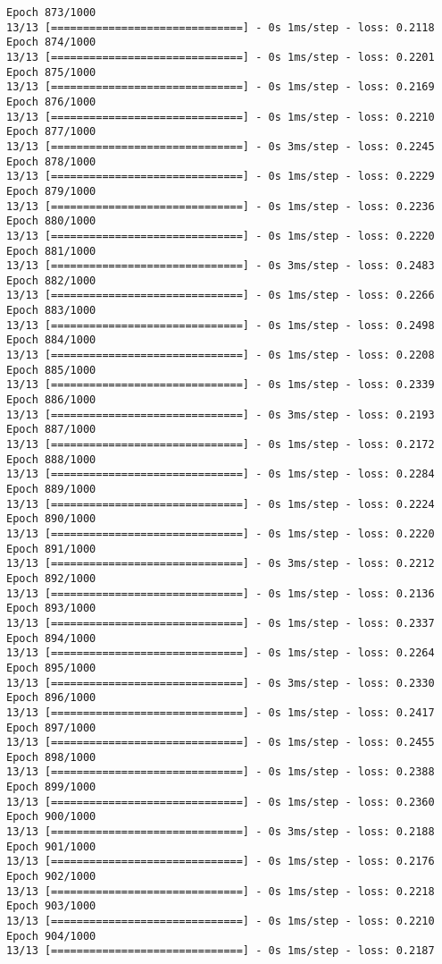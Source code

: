 \documentclass[11pt]{article}
\begin{document}
\begin{Verbatim}[commandchars=\\\{\}]
Epoch 873/1000
13/13 [==============================] - 0s 1ms/step - loss: 0.2118
Epoch 874/1000
13/13 [==============================] - 0s 1ms/step - loss: 0.2201
Epoch 875/1000
13/13 [==============================] - 0s 1ms/step - loss: 0.2169
Epoch 876/1000
13/13 [==============================] - 0s 1ms/step - loss: 0.2210
Epoch 877/1000
13/13 [==============================] - 0s 3ms/step - loss: 0.2245
Epoch 878/1000
13/13 [==============================] - 0s 1ms/step - loss: 0.2229
Epoch 879/1000
13/13 [==============================] - 0s 1ms/step - loss: 0.2236
Epoch 880/1000
13/13 [==============================] - 0s 1ms/step - loss: 0.2220
Epoch 881/1000
13/13 [==============================] - 0s 3ms/step - loss: 0.2483
Epoch 882/1000
13/13 [==============================] - 0s 1ms/step - loss: 0.2266
Epoch 883/1000
13/13 [==============================] - 0s 1ms/step - loss: 0.2498
Epoch 884/1000
13/13 [==============================] - 0s 1ms/step - loss: 0.2208
Epoch 885/1000
13/13 [==============================] - 0s 1ms/step - loss: 0.2339
Epoch 886/1000
13/13 [==============================] - 0s 3ms/step - loss: 0.2193
Epoch 887/1000
13/13 [==============================] - 0s 1ms/step - loss: 0.2172
Epoch 888/1000
13/13 [==============================] - 0s 1ms/step - loss: 0.2284
Epoch 889/1000
13/13 [==============================] - 0s 1ms/step - loss: 0.2224
Epoch 890/1000
13/13 [==============================] - 0s 1ms/step - loss: 0.2220
Epoch 891/1000
13/13 [==============================] - 0s 3ms/step - loss: 0.2212
Epoch 892/1000
13/13 [==============================] - 0s 1ms/step - loss: 0.2136
Epoch 893/1000
13/13 [==============================] - 0s 1ms/step - loss: 0.2337
Epoch 894/1000
13/13 [==============================] - 0s 1ms/step - loss: 0.2264
Epoch 895/1000
13/13 [==============================] - 0s 3ms/step - loss: 0.2330
Epoch 896/1000
13/13 [==============================] - 0s 1ms/step - loss: 0.2417
Epoch 897/1000
13/13 [==============================] - 0s 1ms/step - loss: 0.2455
Epoch 898/1000
13/13 [==============================] - 0s 1ms/step - loss: 0.2388
Epoch 899/1000
13/13 [==============================] - 0s 1ms/step - loss: 0.2360
Epoch 900/1000
13/13 [==============================] - 0s 3ms/step - loss: 0.2188
Epoch 901/1000
13/13 [==============================] - 0s 1ms/step - loss: 0.2176
Epoch 902/1000
13/13 [==============================] - 0s 1ms/step - loss: 0.2218
Epoch 903/1000
13/13 [==============================] - 0s 1ms/step - loss: 0.2210
Epoch 904/1000
13/13 [==============================] - 0s 1ms/step - loss: 0.2187

\end{Verbatim}
\end{document}
